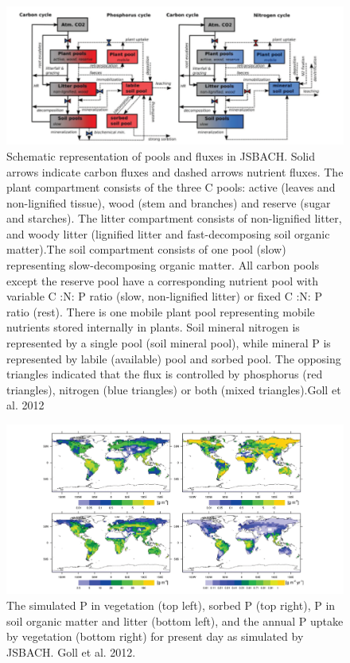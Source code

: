 \documentclass[12pt,oneside]{book}
\begin{document}
\begin{figure}

{\centering \includegraphics[width=0.8\linewidth]{figures/chap5/f521_goll_jsbach} 

}

\caption{Schematic representation of pools and fluxes in JSBACH. Solid arrows indicate carbon fluxes and dashed arrows nutrient fluxes. The plant compartment consists of the three C pools: active (leaves and non-lignified tissue), wood (stem and branches) and reserve (sugar and starches). The litter compartment consists of non-lignified litter, and woody litter (lignified litter and fast-decomposing soil organic matter).The soil compartment consists of one pool (slow) representing slow-decomposing organic matter. All carbon pools except the reserve pool have a corresponding nutrient pool with variable C :N: P ratio (slow, non-lignified litter) or fixed C :N: P ratio (rest). There is one mobile plant pool representing mobile nutrients stored internally in plants. Soil mineral nitrogen is represented by a single pool (soil mineral pool), while mineral P is represented by labile (available) pool and sorbed pool. The opposing triangles indicated that the flux is controlled by phosphorus (red triangles), nitrogen (blue triangles) or both (mixed triangles).Goll et al. 2012}\label{fig:f521}
\end{figure}

\begin{figure}

{\centering \includegraphics[width=0.8\linewidth]{figures/chap5/f522_goll_Pmaps} 

}

\caption{The simulated P in vegetation (top left), sorbed P (top right), P in soil organic matter and litter (bottom left), and the annual P uptake by vegetation (bottom right) for present day as simulated by JSBACH. Goll et al. 2012.}\label{fig:f522}
\end{figure}
\end{document}

